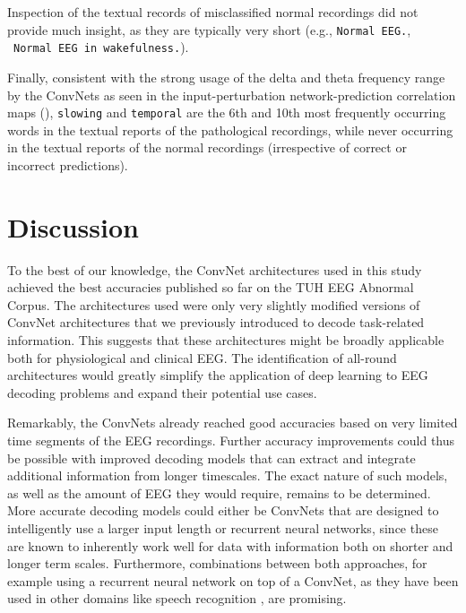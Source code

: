 Inspection of the textual records of misclassified normal recordings did
not provide much insight, as they are typically very short (e.g.,
\texttt{Normal\ EEG.}, ~\texttt{Normal\ EEG\ in\ wakefulness.}).

Finally, consistent with the strong usage of the delta and theta
frequency range by the ConvNets as seen in the input-perturbation
network-prediction correlation maps
(),
\texttt{slowing} and \texttt{temporal} are the 6th and 10th most
frequently occurring words in the textual reports of the pathological
recordings, while never occurring in the textual reports of the normal
recordings (irrespective of correct or incorrect predictions).

\section{Discussion}

    To the best of our knowledge, the ConvNet architectures used in this
study achieved the best accuracies published so far on the TUH EEG
Abnormal Corpus. The architectures used were only very slightly modified
versions of ConvNet architectures that we previously introduced to
decode task-related information. This suggests that these architectures
might be broadly applicable both for physiological and clinical EEG. The
identification of all-round architectures would greatly simplify the
application of deep learning to EEG decoding problems and expand their
potential use cases.

Remarkably, the ConvNets already reached good accuracies based on very
limited time segments of the EEG recordings. Further accuracy
improvements could thus be possible with improved decoding models that
can extract and integrate additional information from longer timescales.
The exact nature of such models, as well as the amount of EEG they would
require, remains to be determined. More accurate decoding models could
either be ConvNets that are designed to intelligently use a larger input
length or recurrent neural networks, since these are known to inherently
work well for data with information both on shorter and longer term
scales. Furthermore, combinations between both approaches, for example
using a recurrent neural network on top of a ConvNet, as they have been
used in other domains like speech recognition
\cite{li_constructing_2015,sainath_convolutional_2015,sak_fast_2015},
are promising.

